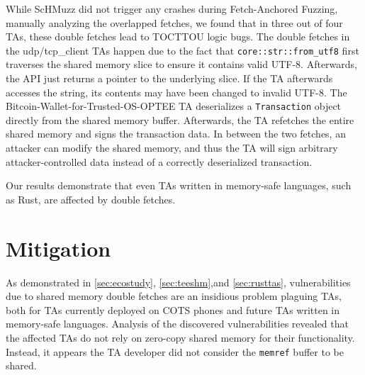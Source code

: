 \documentclass[conference]{IEEEtran}
\newcommand{\sysname}{ScHMuzz\xspace}
\newcommand{\stagetwo}{Fetch-Anchored Fuzzing\xspace}
\begin{document}
While \sysname did not trigger any crashes during \stagetwo, manually analyzing the 
overlapped fetches, we found that in three out of four TAs, these double fetches lead to TOCTTOU logic bugs.
The double fetches in the udp/tcp\_client TAs happen due to the fact that \texttt{core::str::from\_utf8} 
first traverses the shared memory slice to ensure it contains valid UTF-8. Afterwards, the API just 
returns a pointer to the underlying slice. If the TA afterwards accesses the string, 
its contents may have been changed to invalid UTF-8. 
The Bitcoin-Wallet-for-Trusted-OS-OPTEE TA deserializes a \texttt{Transaction} object directly from the 
shared memory buffer. Afterwards, the TA refetches the entire shared memory and signs the transaction 
data. In between the two fetches, an attacker can modify the shared memory, and thus the TA will 
sign arbitrary attacker-controlled data instead of a correctly deserialized transaction.
 
Our results demonstrate that even TAs written in memory-safe languages, such as Rust, are affected by double fetches. 


%
%


\section{Mitigation}\label{sec:mitigation}

As demonstrated in \autoref{sec:ecostudy}, \ref{sec:teeshm},and \ref{sec:rusttas}, vulnerabilities due to shared memory 
double fetches are an insidious problem plaguing TAs, both for TAs currently 
deployed on COTS phones and future TAs written in memory-safe languages.
Analysis of the discovered 
vulnerabilities revealed that the affected TAs do not rely on zero-copy shared 
memory for their functionality. Instead, it appears the TA developer did not 
consider the \texttt{memref} buffer to be shared.
\end{document}
